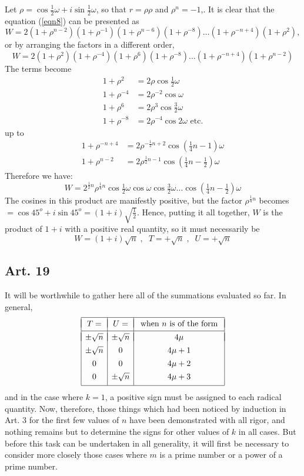 \documentclass{book}
\theoremstyle{plain}
\theoremstyle{remark}
\begin{document}
Let $\rho = \cos \tfrac{1}{2} \omega + i \sin \tfrac{1}{2} \omega$, so that $r = \rho \rho$ and $\rho^n=-1$,.  It is clear that the equation (\ref{eqn8}) can be presented as
\[ W = 2(1+\rho^{n-2})(1+\rho^{-1})(1+\rho^{n-6})(1+\rho^{-8}) \dots (1+\rho^{-n+4})(1+\rho^2), \]
or by arranging the factors in a different order,
\[ W = 2(1+\rho^2)(1+\rho^{-4})(1+\rho^6)(1+\rho^{-8})\dots (1+\rho^{-n+4})(1+\rho^{n-2}) \]
The terms become
\begin{align*}
1 + \rho^2 &= 2\rho \cos \tfrac{1}{2} \omega \\
1 + \rho^{-4} &= 2\rho^{-2} \cos  \omega \\
1 + \rho^6 &= 2\rho^3 \cos \tfrac{3}{2} \omega \\
1 + \rho^{-8} &= 2\rho ^{-4}\cos 2 \omega \textrm{ etc.}
\end{align*}
up to
\begin{align*}1+\rho^{-n+4} &= 2 \rho^{-\frac{1}{2}n+2} \cos\left(\tfrac{1}{4}n-1\right)\omega \\
1+\rho^{n-2} &= 2\rho^{\frac{1}{2}n-1} \cos\left(\tfrac{1}{4}n -\tfrac{1}{2}\right) \omega \end{align*}
Therefore we have:
\[ W = 2^{\frac{1}{2}n} \rho^{\frac{1}{4} n} \cos \tfrac{1}{2}\omega \cos \omega \cos \tfrac{3}{2} \omega \dots \cos\left(\tfrac{1}{4}n-\tfrac{1}{2}\right)\omega \]
The cosines in this product are manifestly positive, but the factor $\rho^{\frac{1}{4} n} $ becomes $=\cos 45^o + i \sin 45^o=(1+i)\sqrt{\frac{1}{2}}$.  Hence, putting it all together, $W$ is the product of $1+i$ with a positive real quantity, so it must necessarily be 
\[ W = (1+i)\sqrt{n} \;, \; \; T = +\sqrt{n} \; , \; \; U = +\sqrt{n} \]
\subsection*{Art. 19}
It will be worthwhile to gather here all of the summations evaluated so far.  In general, 
\[ \begin{array}{|c|c|c|}  \hline &&
\\[-10pt]
  T = & U = & \textrm{ when } n \textrm{ is of the form }  \\[2pt] 
  \hline && \\[-10pt]  \pm \sqrt{n} & \pm \sqrt{n} & 4\mu \\[4pt]
 \pm \sqrt{n} & 0 & 4\mu + 1 \\[4pt]
  0 & 0 & 4\mu +2 \\[4pt]
  0 & \pm \sqrt{n} & 4\mu + 3 \\[4pt]
  \hline
  \end{array}  \]
and in the case where $k=1$, a positive sign must be assigned to each radical quantity.  Now, therefore, those things which had been noticed by induction in Art. 3 for the first few values of $n$ have been demonstrated with all rigor, and nothing remains but to determine the signs for other values of $k$ in all cases.  But before this task can be undertaken in all generality, it will first be necessary to consider more closely those cases where $m$ is a prime number or a power of a prime number.
\end{document}

